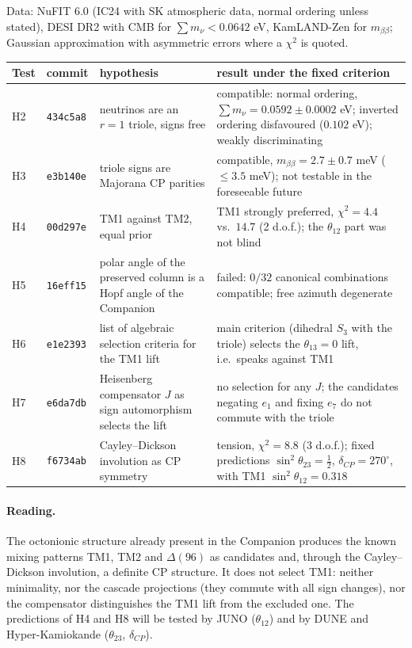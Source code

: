 Data: NuFIT 6.0 (IC24 with SK atmospheric data, normal ordering unless stated), DESI DR2 with CMB for
\(\sum m_\nu<0.0642\) eV, KamLAND-Zen for \(m_{\beta\beta}\); Gaussian approximation with asymmetric
errors where a \(\chi^2\) is quoted.
\begin{center}
\small
\begin{tabular}{>{\raggedright\arraybackslash}p{}>{\raggedright\arraybackslash}p{}>{\raggedright\arraybackslash}p{}>{\raggedright\arraybackslash}p{}}
\toprule
Test & commit & hypothesis & result under the fixed criterion\\
\midrule
H2 & \texttt{434c5a8} & neutrinos are an \(r=1\) triole, signs free & compatible: normal ordering, \(\sum m_\nu=0.0592\pm0.0002\) eV; inverted ordering disfavoured (\(0.102\) eV); weakly discriminating\\
H3 & \texttt{e3b140e} & triole signs are Majorana CP parities & compatible, \(m_{\beta\beta}=2.7\pm0.7\) meV (\(\le3.5\) meV); not testable in the foreseeable future\\
H4 & \texttt{00d297e} & TM1 against TM2, equal prior & TM1 strongly preferred, \(\chi^2=4.4\) vs.\ \(14.7\) (2 d.o.f.); the \(\theta_{12}\) part was not blind\\
H5 & \texttt{16eff15} & polar angle of the preserved column is a Hopf angle of the Companion & failed: \(0/32\) canonical combinations compatible; free azimuth degenerate\\
H6 & \texttt{e1e2393} & list of algebraic selection criteria for the TM1 lift & main criterion (dihedral \(S_3\) with the triole) selects the \(\theta_{13}=0\) lift, i.e.\ speaks against TM1\\
H7 & \texttt{e6da7db} & Heisenberg compensator \(J\) as sign automorphism selects the lift & no selection for any \(J\); the candidates negating \(e_1\) and fixing \(e_7\) do not commute with the triole\\
H8 & \texttt{f6734ab} & Cayley--Dickson involution as CP symmetry & tension, \(\chi^2=8.8\) (3 d.o.f.); fixed predictions \(\sin^2\theta_{23}=\tfrac12\), \(\delta_{CP}=270^\circ\), with TM1 \(\sin^2\theta_{12}=0.318\)\\
\bottomrule
\end{tabular}
\end{center}

\paragraph{Reading.}
The octonionic structure already present in the Companion produces the known mixing patterns TM1, TM2
and \(\Delta(96)\) as candidates and, through the Cayley--Dickson involution, a definite CP structure.  It
does not select TM1: neither minimality, nor the cascade projections (they commute with all sign changes),
nor the compensator distinguishes the TM1 lift from the excluded one.  The predictions of H4 and H8 will be
tested by JUNO (\(\theta_{12}\)) and by DUNE and Hyper-Kamiokande (\(\theta_{23}\), \(\delta_{CP}\)).

